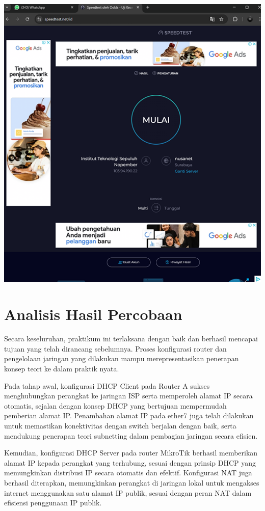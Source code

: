\begin{enumerate}
\begin{center}
        \includegraphics[scale=0.5]{P1/img/ireng4.png}
    \end{center}

\end{enumerate}
\section{Analisis Hasil Percobaan}
Secara keseluruhan, praktikum ini terlaksana dengan baik dan berhasil mencapai tujuan yang telah dirancang sebelumnya. Proses konfigurasi router dan pengelolaan jaringan yang dilakukan mampu merepresentasikan penerapan konsep teori ke dalam praktik nyata.

Pada tahap awal, konfigurasi DHCP Client pada Router A sukses menghubungkan perangkat ke jaringan ISP serta memperoleh alamat IP secara otomatis, sejalan dengan konsep DHCP yang bertujuan mempermudah pemberian alamat IP. Penambahan alamat IP pada ether7 juga telah dilakukan untuk memastikan konektivitas dengan switch berjalan dengan baik, serta mendukung penerapan teori subnetting dalam pembagian jaringan secara efisien.

Kemudian, konfigurasi DHCP Server pada router MikroTik berhasil memberikan alamat IP kepada perangkat yang terhubung, sesuai dengan prinsip DHCP yang memungkinkan distribusi IP secara otomatis dan efektif. Konfigurasi NAT juga berhasil diterapkan, memungkinkan perangkat di jaringan lokal untuk mengakses internet menggunakan satu alamat IP publik, sesuai dengan peran NAT dalam efisiensi penggunaan IP publik.

